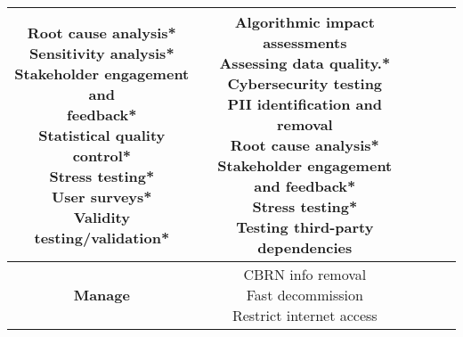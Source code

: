 \documentclass[fleqn]{article}
\begin{document}
\begin{landscape}
\begin{table}[H]
\begin{tabular}{|c|c|c|c|c|}
{			\textbullet\hspace{3pt} Root cause analysis*\\  	
			\textbullet\hspace{3pt} Sensitivity analysis*\\  	
			\textbullet\hspace{3pt} Stakeholder engagement and\\\hspace{10pt}feedback*\\  	
			\textbullet\hspace{3pt} Statistical quality control*\\  	
			\textbullet\hspace{3pt} Stress testing*\\  		
			\textbullet\hspace{3pt} User surveys*\\  	
			\textbullet\hspace{3pt} Validity testing/validation*\\  
 	    }
		& \makecell[l]{
			\textbullet\hspace{3pt} Algorithmic impact assessments\\  	
			\textbullet\hspace{3pt} Assessing data quality.* \\
			\textbullet\hspace{3pt} Cybersecurity testing\\  
			\textbullet\hspace{3pt} PII identification and removal\\  		
			\textbullet\hspace{3pt} Root cause analysis*\\  	
			\textbullet\hspace{3pt} Stakeholder engagement and feedback*\\  	
			\textbullet\hspace{3pt} Stress testing*\\  	
			\textbullet\hspace{3pt} Testing third-party dependencies \\
		} \\
		\hline
		\textbf{Manage} & 
		\makecell[l]{
			\textbullet\hspace{3pt} CBRN info removal\\  
			\textbullet\hspace{3pt} Fast decommission \\ 	
			\textbullet\hspace{3pt} Restrict internet access \\ 	
}
\end{tabular}
\end{table}
\end{landscape}
\end{document}
